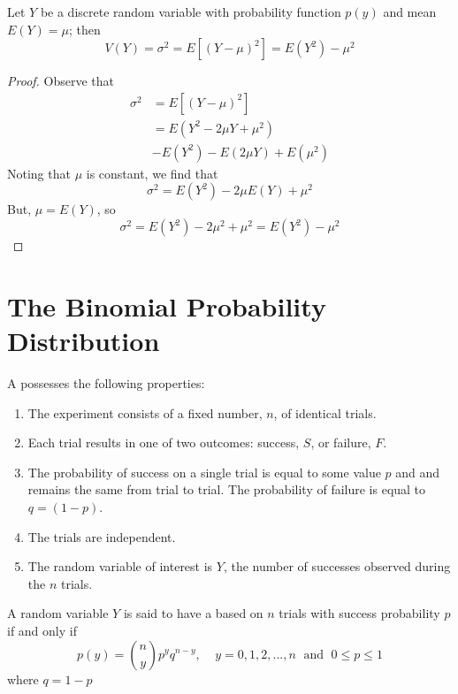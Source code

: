 \documentclass[12pt, a4paper, twoside, openright, titlepage]{book}
\begin{document}
\begin{thm}{}{}
    Let $Y$ be a discrete random variable with probability function $p(y)$ and mean $E(Y) = \mu$; then \begin{equation*}
        V(Y) = \sigma^2 = E[(Y-\mu)^2] = E(Y^2) - \mu^2
    \end{equation*}
\end{thm}
\begin{proof}{}{}
    Observe that \begin{align*}
        \sigma^2 &= E[(Y-\mu)^2] \\
        &= E(Y^2-2\mu Y+\mu^2) \\
        &- E(Y^2) - E(2\mu Y) + E(\mu^2)
    \end{align*}
    Noting that $\mu$ is constant, we find that \begin{equation*}
        \sigma^2 = E(Y^2) - 2\mu E(Y) + \mu^2
    \end{equation*}
    But, $\mu = E(Y)$, so \begin{equation*}
        \sigma^2 = E(Y^2)-2\mu^2+\mu^2 = E(Y^2)-\mu^2
    \end{equation*}
\end{proof}


\section{\textsection The Binomial Probability Distribution}

\begin{defn}{}{}
    A  possesses the following properties: \begin{enumerate}
        \item The experiment consists of a fixed number, $n$, of identical trials.
        \item Each trial results in one of two outcomes: success, $S$, or failure, $F$.
        \item The probability of success on a single trial is equal to some value $p$ and and remains the same from trial to trial. The probability of failure is equal to $q = (1-p)$.
        \item The trials are independent.
        \item The random variable of interest is $Y$, the number of successes observed during the $n$ trials.
    \end{enumerate}
\end{defn}

\begin{defn}{}{}
    A random variable $Y$ is said to have a  based on $n$ trials with success probability $p$ if and only if \begin{equation*}
        p(y) = \binom{n}{y}p^yq^{n-y},\;\;\;\; y =0,1,2,...,n\;\text{ and }\;0\leq p \leq 1
    \end{equation*}
    where $q = 1-p$
\end{defn}
\end{document}
